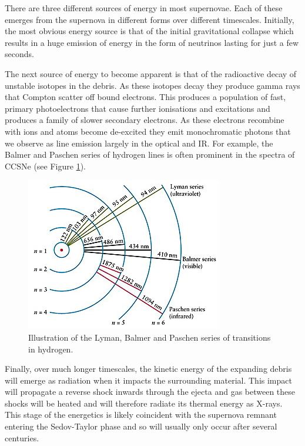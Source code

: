There are three different sources of energy in most supernovae.  Each of these emerges from the supernova in different forms over different timescales.  Initially, the most obvious energy source is that of the initial gravitational collapse which results in a huge emission of energy in the form of neutrinos lasting for just a few seconds.  

The next source of energy to become apparent is that of the radioactive decay of unstable isotopes in the debris.  As these isotopes decay they produce gamma rays that Compton scatter off bound electrons.  This produces a population of fast, primary photoelectrons that cause further ionisations and excitations and produces a family of slower secondary electrons.  As these electrons recombine with ions and atoms become de-excited they emit monochromatic photons that we observe as line emission largely in the optical and IR.  For example, the Balmer and Paschen series of hydrogen lines is often prominent in the spectra of CCSNe (see Figure \ref{fig:balmer}).

 \begin{figure}
\centering
\includegraphics[clip=true,scale=0.9,trim= 0 0 0 0]{chapters/chapter1/figs/balmer1.jpg}
\caption{Illustration of the Lyman, Balmer and Paschen series of transitions in hydrogen.}
\label{fig:balmer}
\end{figure}


Finally, over much longer timescales, the kinetic energy of the expanding debris will emerge as radiation when it impacts the surrounding material.  This impact will propagate a reverse shock inwards through the ejecta and gas between these shocks will be heated and will therefore radiate its thermal energy as X-rays.  This stage of the energetics is likely coincident with the supernova remnant entering the Sedov-Taylor phase and so will usually only occur after several centuries.  

